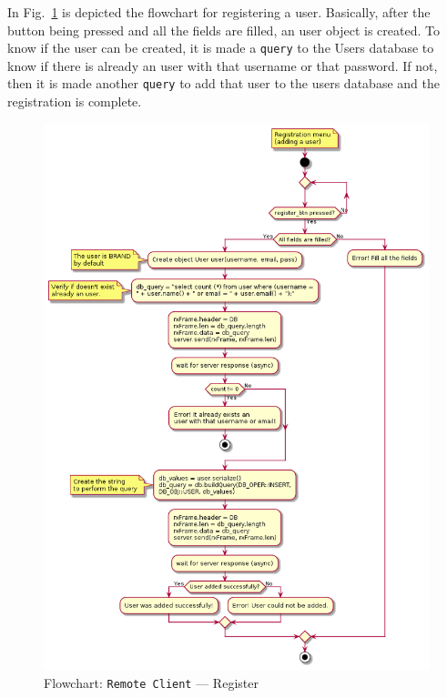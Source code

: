 In Fig.~\ref{fig:flow-rc-register-user} is depicted the flowchart for registering a user.
Basically, after the button being pressed and all the fields are filled, an user object is created. To know if the user can be created, it is made a \texttt{query} to the Users database to know if there is already an user with that username or that password. If not, then it is made another \texttt{query} to add that user to the users database and the registration is complete. 
%
\begin{figure}[htb!]
\centering
    \includegraphics[width=0.8\columnwidth]{./img/flow-rc-register-user.png}
  \caption{Flowchart: \texttt{Remote Client} --- Register}%
\label{fig:flow-rc-register-user}
\end{figure}

